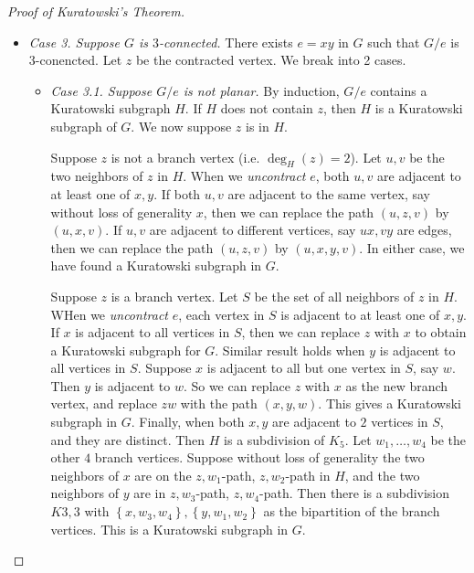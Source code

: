\documentclass[co342]{subfiles}
\begin{document}
\begin{proof}[Proof of Kuratowski's Theorem]
\begin{itemize}
                On the other hand, assume every $H_i$ is planar for the sake of contradiction. Then there exists an embedding of each $H_i$ with $xy$ on the outer face. We now construct an embedding of $G$ inductively. Start with an embedding of $H_1$. Suppose we have embedded $H_1,\ldots,H_i$. We look for a face containing $xy$, and embed $H_{i+1}$ in this face. Once we embed $H_k$, remove $xy$ if it is not in $G$. This means $G$ is planar, a contradiction.

            \item \textit{Case 3. Suppose $G$ is $3$-connected.} There exists $e=xy$ in $G$ such that $G /e$ is $3$-conencted. Let $z$ be the contracted vertex. We break into 2 cases.
                \begin{itemize}
                    \item \textit{Case 3.1. Suppose $G /e$ is not planar.} By induction, $G /e$ contains a Kuratowski subgraph $H$. If $H$ does not contain $z$, then $H$ is a Kuratowski subgraph of $G$. We now suppose $z$ is in $H$. 

                        Suppose $z$ is not a branch vertex (i.e. $\deg_H\left( z \right)=2$). Let $u,v$ be the two neighbors of $z$ in $H$. When we \textit{uncontract} $e$, both $u,v$ are adjacent to at least one of $x,y$. If both $u,v$ are adjacent to the same vertex, say without loss of generality $x$, then we can replace the path $\left( u,z,v \right)$ by $\left( u,x,v \right)$. If $u,v$ are adjacent to different vertices, say $ux, vy$ are edges, then we can replace the path $\left( u,z,v \right)$ by $\left( u,x,y,v \right)$. In either case, we have found a Kuratowski subgraph in $G$.

                        Suppose $z$ is a branch vertex. Let $S$ be the set of all neighbors of $z$ in $H$. WHen we \textit{uncontract} $e$, each vertex in $S$ is adjacent to at least one of $x,y$. If $x$ is adjacent to all vertices in $S$, then we can replace $z$ with $x$ to obtain a Kuratowski subgraph for $G$. Similar result holds when $y$ is adjacent to all vertices in $S$. Suppose $x$ is adjacent to all but one vertex in $S$, say $w$. Then $y$ is adjacent to $w$. So we can replace $z$ with $x$ as the new branch vertex, and replace $zw$ with the path $\left( x,y,w \right)$. This gives a Kuratowski subgraph in $G$. Finally, when both $x,y$ are adjacent to $2$ vertices in $S$, and they are distinct. Then $H$ is a subdivision of $K_5$. Let $w_1,\ldots,w_4$ be the other $4$ branch vertices. Suppose without loss of generality the two neighbors of $x$ are on the $z,w_1$-path, $z,w_2$-path in $H$, and the two neighbors of $y$ are in $z,w_3$-path, $z,w_4$-path. Then there is a subdivision $K{3,3}$ with $\left\lbrace x,w_3,w_4 \right\rbrace, \left\lbrace y,w_1,w_2 \right\rbrace$ as the bipartition of the branch vertices. This is a Kuratowski subgraph in $G$.


\end{itemize}
\end{itemize}
\end{proof}
\end{document}
